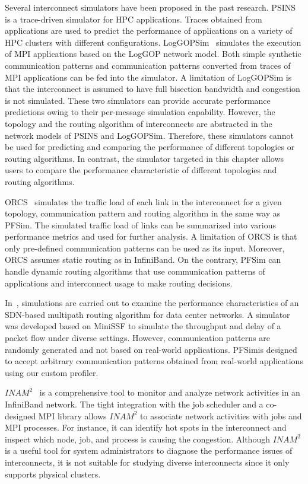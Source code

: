 Several interconnect simulators have been proposed in the past research.
PSINS~\autocite{Tikir2009} is a trace-driven simulator for HPC
applications. Traces obtained from applications are used to predict the
performance of applications on a variety of HPC clusters with different
configurations. LogGOPSim~\autocite{Hoefler2010} simulates the execution
of MPI applications based on the LogGOP network model. Both simple
synthetic communication patterns and communication patterns converted
from traces of MPI applications can be fed into the simulator. A
limitation of LogGOPSim is that the interconnect is assumed to have full
bisection bandwidth and congestion is not simulated. These two
simulators can provide accurate performance predictions owing to their
per-message simulation capability. However, the topology and the routing
algorithm of interconnects are abstracted in the network models of PSINS
and LogGOPSim. Therefore, these simulators cannot be used for predicting
and comparing the performance of different topologies or routing
algorithms. In contrast, the simulator targeted in this chapter allows
users to compare the performance characteristic of different topologies
and routing algorithms.

ORCS~\autocite{Schneider2009} simulates the traffic load of each link in
the interconnect for a given topology, communication pattern and routing
algorithm in the same way as PFSim. The simulated traffic load of links can be
summarized into various performance metrics and used for further analysis. A
limitation of ORCS is that only pre-defined communication patterns can be used
as its input. Moreover, ORCS assumes static routing as in InfiniBand. On the
contrary, PFSim can handle dynamic routing algorithms that use communication
patterns of applications and interconnect usage to make routing decisions.

In~\autocite{Jo2015}, simulations are carried out to examine the
performance characteristics of an SDN-based multipath routing algorithm
for data center networks. A simulator was developed based on MiniSSF to
simulate the throughput and delay of a packet flow under diverse
settings. However, communication patterns are randomly generated and not
based on real-world applications. PFSimis designed to accept arbitrary
communication patterns obtained from real-world applications using our custom
profiler.

\(\mathit{INAM}^2\)~\autocite{Subramoni2016} is a comprehensive tool to
monitor and analyze network activities in an InfiniBand network. The
tight integration with the job scheduler and a co-designed MPI library
allows \(\mathit{INAM}^2\) to associate network activities with jobs and
MPI processes. For instance, it can identify hot spots in the
interconnect and inspect which node, job, and process is causing the
congestion. Although \(\mathit{INAM}^2\) is a useful tool for system
administrators to diagnose the performance issues of interconnects, it
is not suitable for studying diverse interconnects since it only
supports physical clusters.

